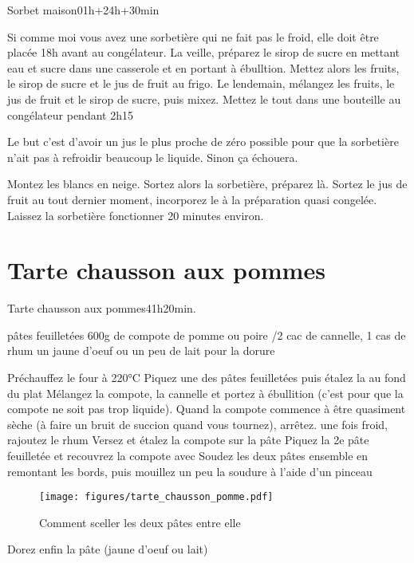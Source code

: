 {\begin{recette}{Sorbet maison}{0}{1h+24h+30min}{}
\begin{preparation}
\etape Si comme moi vous avez une sorbetière qui ne fait pas le froid, elle doit être placée 18h avant au congélateur. 
\etape La veille, préparez le sirop de sucre en mettant eau et sucre dans une casserole et en portant à ébulltion. 
\etape Mettez alors les fruits, le sirop de sucre et le jus de fruit au frigo. 
\etape Le lendemain, mélangez les fruits, le jus de fruit et le sirop de sucre, puis mixez. 
\etape Mettez le tout dans une bouteille au congélateur pendant 2h15
\begin{remarque}
Le but c'est d'avoir un jus le plus proche de zéro possible pour que la sorbetière n'ait pas à refroidir beaucoup le liquide. Sinon ça échouera.
\end{remarque}

\etape Montez les blancs en neige.
\etape Sortez alors la sorbetière, préparez là.
\etape Sortez le jus de fruit au tout dernier moment, incorporez le à la préparation quasi congelée.
\etape Laissez la sorbetière fonctionner 20 minutes environ.
\end{preparation}
\end{recette}

\section{Tarte chausson aux pommes}
\begin{recette}{Tarte chausson aux pommes}{4}{1h}{20min.}
\begin{ingredients}
 pâtes feuilletées
\ingredient 600g de compote de pomme ou poire
/2 cac de cannelle, 1 cas de rhum
\ingredient un jaune d'oeuf ou un peu de lait pour la dorure
\end{ingredients}

\begin{preparation}
\etape Préchauffez le four à 220°C
\etape Piquez une des pâtes feuilletées puis étalez la au fond du plat
\etape Mélangez la compote, la cannelle et portez à ébullition (c'est pour que la compote ne soit pas trop liquide). Quand la compote commence à être quasiment sèche (à faire un bruit de succion quand vous tournez), arrêtez.
\etape une fois froid, rajoutez le rhum
\etape Versez et étalez la compote sur la pâte 
\etape Piquez la 2e pâte feuilletée et recouvrez la compote avec
\etape Soudez les deux pâtes ensemble en remontant les bords, puis mouillez un peu la soudure à l'aide d'un pinceau
\begin{figure}[htb]
\centering
\texttt{[image: figures/tarte\_chausson\_pomme.pdf]}
\caption{Comment sceller les deux pâtes entre elle}
\end{figure}
\etape Dorez enfin la pâte (jaune d'oeuf ou lait)
\end{preparation}




\end{recette}}
